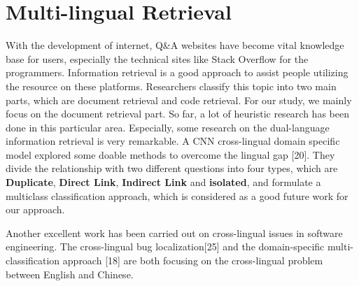 \section{Multi-lingual Retrieval}
With the development of internet, Q\&A websites have become vital knowledge base for users, especially the technical sites like Stack Overflow for the programmers. Information retrieval is a good approach to assist people utilizing the resource on these platforms. Researchers classify this topic into two main parts, which are document retrieval and code retrieval. For our study, we mainly focus on the document retrieval part. So far, a lot of heuristic research has been done in this particular area. Especially, some research on the dual-language information retrieval is very remarkable. A CNN cross-lingual domain specific model explored some doable methods to overcome the lingual gap [20]. They divide the relationship with two different questions into four types, which are {\bf Duplicate}, {\bf Direct Link}, {\bf Indirect Link} and {\bf isolated}, and formulate a multiclass classification approach, which is considered as a good future work for our approach.
\par
Another excellent work has been carried out on cross-lingual issues in software engineering. The cross-lingual bug localization[25] and the domain-specific multi-classification approach [18] are both focusing on the cross-lingual problem between English and Chinese.
\begin{comment}
\par
In our paper, we need to deal with Russian query recommendation task. Given a Russian query and tags and automatically recommend some high-relevant English posts. 
\end{comment}

